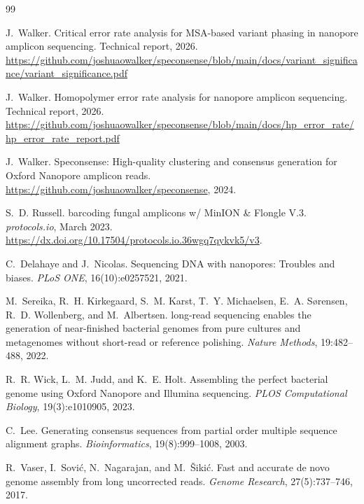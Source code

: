 \documentclass[11pt]{article}
\begin{document}
\begin{thebibliography}{99}

J.~Walker.
\newblock Critical error rate analysis for {MSA}-based variant phasing in
nanopore amplicon sequencing.
\newblock Technical report, 2026.
\newblock \url{https://github.com/joshuaowalker/speconsense/blob/main/docs/variant_significance/variant_significance.pdf}

J.~Walker.
\newblock Homopolymer error rate analysis for nanopore amplicon sequencing.
\newblock Technical report, 2026.
\newblock \url{https://github.com/joshuaowalker/speconsense/blob/main/docs/hp_error_rate/hp_error_rate_report.pdf}

J.~Walker.
\newblock Speconsense: High-quality clustering and consensus generation for
{Oxford Nanopore} amplicon reads.
\newblock \url{https://github.com/joshuaowalker/speconsense}, 2024.

S.~D. Russell.
 barcoding fungal amplicons w/ {MinION \& Flongle V.3}.
\newblock \emph{protocols.io}, March 2023.
\newblock \url{https://dx.doi.org/10.17504/protocols.io.36wgq7qykvk5/v3}.

C.~Delahaye and J.~Nicolas.
\newblock Sequencing {DNA} with nanopores: Troubles and biases.
\newblock \emph{PLoS ONE}, 16(10):e0257521, 2021.

M.~Sereika, R.~H. Kirkegaard, S.~M. Karst, T.~Y. Michaelsen, E.~A.
S{\o}rensen, R.~D. Wollenberg, and M.~Albertsen.
 long-read sequencing enables the generation of
near-finished bacterial genomes from pure cultures and metagenomes without
short-read or reference polishing.
\newblock \emph{Nature Methods}, 19:482--488, 2022.

R.~R. Wick, L.~M. Judd, and K.~E. Holt.
\newblock Assembling the perfect bacterial genome using {Oxford Nanopore} and
{Illumina} sequencing.
\newblock \emph{PLOS Computational Biology}, 19(3):e1010905, 2023.

C.~Lee.
\newblock Generating consensus sequences from partial order multiple sequence
alignment graphs.
\newblock \emph{Bioinformatics}, 19(8):999--1008, 2003.

R.~Vaser, I.~Sovi\'{c}, N.~Nagarajan, and M.~\v{S}iki\'{c}.
\newblock Fast and accurate de novo genome assembly from long uncorrected reads.
\newblock \emph{Genome Research}, 27(5):737--746, 2017.

\end{thebibliography}
\end{document}
